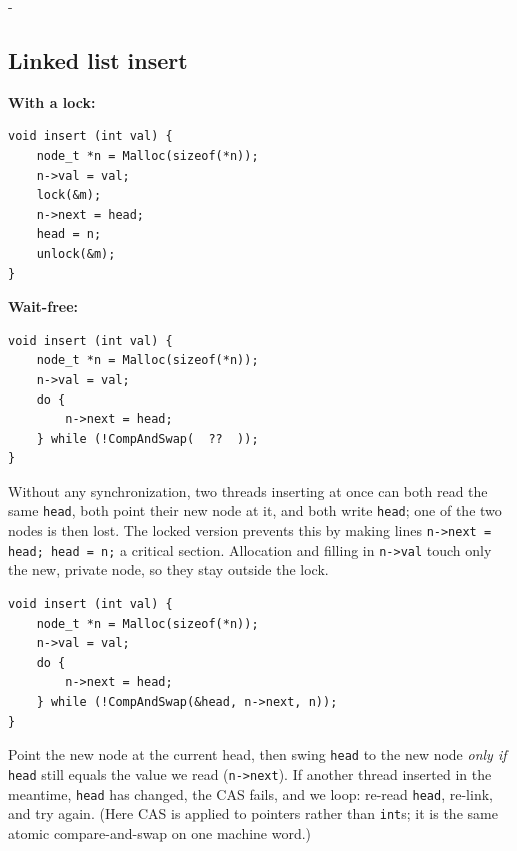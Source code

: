 \documentclass[11pt,a4paper]{article}
\makeatletter
\newcommand{\keepspace}[1]{\par\penalty-100\begingroup
  \setlength{\dimen@}{#1}\dimen@ii\pagegoal\advance\dimen@ii-\pagetotal
  \ifdim\dimen@>\dimen@ii\ifdim\dimen@ii>\z@\vfil\fi\break\fi\endgroup}
\makeatother
\begin{document}
\keepspace{14\baselineskip}
\subsection{Linked list insert}

\begin{center}
\begin{minipage}[t]{0.46\textwidth}
\textbf{With a lock:}
\begin{lstlisting}[numbers=none]
void insert (int val) {
    node_t *n = Malloc(sizeof(*n));
    n->val = val;
    lock(&m);
    n->next = head;
    head = n;
    unlock(&m);
}
\end{lstlisting}
\end{minipage}\hfill
\begin{minipage}[t]{0.51\textwidth}
\textbf{Wait-free:}
\begin{lstlisting}[numbers=none]
void insert (int val) {
    node_t *n = Malloc(sizeof(*n));
    n->val = val;
    do {
        n->next = head;
    } while (!CompAndSwap(  ??  ));
}
\end{lstlisting}
\end{minipage}
\end{center}

Without any synchronization, two threads inserting at once can both read the
same \texttt{head}, both point their new node at it, and both write
\texttt{head}; one of the two nodes is then lost. The locked version prevents
this by making lines \texttt{n->next = head; head = n;} a critical section.
Allocation and filling in \texttt{n->val} touch only the new, private node,
so they stay outside the lock.

\begin{solbox}
\begin{lstlisting}[numbers=none]
void insert (int val) {
    node_t *n = Malloc(sizeof(*n));
    n->val = val;
    do {
        n->next = head;
    } while (!CompAndSwap(&head, n->next, n));
}
\end{lstlisting}
Point the new node at the current head, then swing \texttt{head} to the new
node \emph{only if} \texttt{head} still equals the value we read
(\texttt{n->next}). If another thread inserted in the meantime,
\texttt{head} has changed, the CAS fails, and we loop: re-read
\texttt{head}, re-link, and try again. (Here CAS is applied to pointers
rather than \texttt{int}s; it is the same atomic compare-and-swap on one
machine word.)
\end{solbox}
\end{document}
